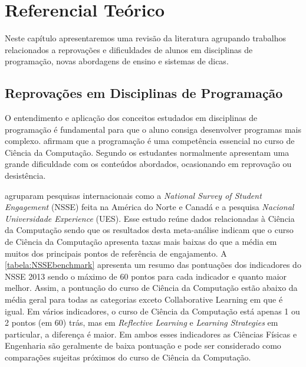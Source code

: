 \chapter{Referencial Teórico}

Neste capítulo apresentaremos uma revisão da literatura agrupando trabalhos relacionados a reprovações e dificuldades de alunos em disciplinas de programação, novas abordagens de ensino e sistemas de dicas. 

\section{Reprovações em Disciplinas de Programação}

O entendimento e aplicação dos conceitos estudados em disciplinas de programação é fundamental para que o aluno consiga desenvolver programas mais complexo.  afirmam que a programação é uma competência essencial no curso de Ciência da Computação. Segundo  os estudantes normalmente apresentam uma grande dificuldade com os conteúdos abordados, ocasionando em reprovação ou desistência.

 agruparam pesquisas internacionais como a \textit{National Survey of Student Engagement} (NSSE) feita na América do Norte e Canadá e a pesquisa \textit{Nacional Universidade Experience} (UES). Esse estudo reúne dados relacionadas à Ciência da Computação sendo que os resultados desta meta-análise indicam que o curso de Ciência da Computação apresenta taxas mais baixas do que a média em muitos dos principais pontos de referência de engajamento. A \cref{tabela:NSSEbenchmark} apresenta um resumo das pontuações dos indicadores do NSSE 2013 sendo o máximo de 60 pontos para cada indicador e quanto maior melhor. Assim, a pontuação do curso de Ciência da Computação estão abaixo da média geral para todas as categorias exceto Collaborative Learning em que é igual. Em vários indicadores, o curso de Ciência da Computação está apenas 1 ou 2 pontos (em 60) trás, mas em \textit{Reflective Learning} e \textit{Learning Strategies} em particular, a diferença é maior. Em ambos esses indicadores as Ciências Físicas e Engenharia são geralmente de baixa pontuação e pode ser considerado como comparações sujeitas próximos do curso de Ciência da Computação. 

